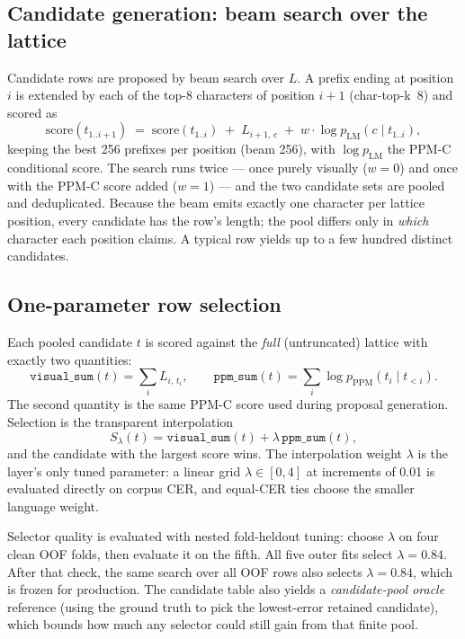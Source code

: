 \documentclass[11pt]{article}
\newcommand{\cer}{\mbox{CER}}
\begin{document}
\subsection{Candidate generation: beam search over the lattice}
Candidate rows are proposed by beam search over $L$. A prefix ending at position $i$ is extended
by each of the top-8 characters of position $i{+}1$ (char-top-k~8) and scored as
\[
  \mathrm{score}(t_{1..i+1}) \;=\; \mathrm{score}(t_{1..i}) \;+\; L_{i+1,\,c}
  \;+\; w \cdot \log p_{\mathrm{LM}}(c \mid t_{1..i}),
\]
keeping the best 256 prefixes per position (beam 256), with $\log p_{\mathrm{LM}}$ the PPM-C
conditional score. The search runs twice --- once purely visually ($w{=}0$) and once with the
PPM-C score added ($w{=}1$) --- and the two candidate sets are pooled and deduplicated. Because
the beam emits exactly one character per lattice position, every candidate has the row's length;
the pool differs only in \emph{which} character each position claims. A typical row yields up to a
few hundred distinct candidates.

\subsection{One-parameter row selection}
\label{sec:ranker}
Each pooled candidate $t$ is scored against the \emph{full} (untruncated) lattice with exactly two
quantities:
\[
  \texttt{visual\_sum}(t) = \sum_i L_{i,\,t_i}, \qquad
  \texttt{ppm\_sum}(t) = \sum_i \log p_{\mathrm{PPM}}(t_i \mid t_{<i}).
\]
The second quantity is the same PPM-C score used during proposal generation. Selection is the
transparent interpolation
\[
  S_\lambda(t) = \texttt{visual\_sum}(t) + \lambda\,\texttt{ppm\_sum}(t),
\]
and the candidate with the largest score wins. The interpolation weight $\lambda$ is the layer's
only tuned parameter: a linear grid $\lambda\in[0,4]$ at increments of 0.01 is evaluated directly
on corpus \cer{}, and equal-\cer{} ties choose the smaller language weight.

Selector quality is evaluated with nested fold-heldout tuning: choose $\lambda$ on four clean OOF
folds, then evaluate it on the fifth. All five outer fits select $\lambda=0.84$. After that check,
the same search over all OOF rows also selects $\lambda=0.84$, which is frozen for production.
The candidate table also
yields a \emph{candidate-pool oracle} reference (using the ground truth to pick the lowest-error
retained candidate), which bounds how much any selector could still gain from that finite pool.
\end{document}
